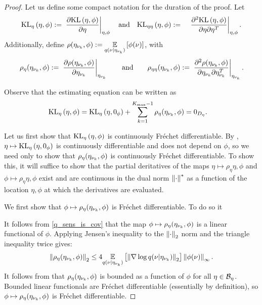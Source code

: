 \begin{thm}
\begin{proof}
Let us define some compact notation for the duration of the proof.
Let
%
\begin{align*}
%
\KLgrad{\eta, \phi} :={}&
    \fracat{\partial \KL{\eta, \phi}}{\partial \eta}{\eta, \phi}
\mathtxt{and}
\KLhess{\eta, \phi} :={}&
    \fracat{\partial^2 \KL{\eta, \phi}}
           {\partial \eta \partial \eta^T}{\eta, \phi}.
%
\end{align*}
%
Additionally, define $\rho(\eta_{\nu_{k}}, \phi) :={} \underset{q(\nu \vert
\eta_{\nu_{k}})}{\mathbb{E}}\left[\phi(\nu)\right]$, with
%
\begin{align*}
%
\rho_\eta(\etanuk, \phi) :={}
\fracat{\partial \rho(\etanuk, \phi)}
       {\partial \etanuk}{\etanuk} \mathand
\rho_{\eta\eta}(\etanuk, \phi) :={}
   \fracat{\partial^2 \rho(\etanuk, \phi)}
          {\partial \etanuk \partial \etanuk^T}{\etanuk}.
%
\end{align*}

Observe that the estimating equation can be written as
%
\begin{align*}
%
%
\KLgrad{\eta, \phi} ={}&
\KLgrad{\eta, \phiz} + \sumkm \rho_\eta(\etanuk, \phi)
= 0_\etadim.
%
\end{align*}

Let us first show that $\mathrm{KL}_{\eta}\left(\eta, \phi\right)$ is continuously Fr{\'e}chet
differentiable.  By , $\eta \mapsto \mathrm{KL}_{\eta}\left(\eta, 0_\phi\right)$
is continuously differentiable and does not depend on $\phi$, so we need only to
show that $\rho_\eta(\eta_{\nu_{k}}, \phi)$ is continuously Fr{\'e}chet differentiable.
To show this, it will suffice to show that the partial deritatives of the maps
$\eta \mapsto \rho_\eta{\eta, \phi}$ and $\phi \mapsto \rho_\eta{\eta, \phi}$
exist and are continuous in the dual norm $\left\Vert\cdot\right\Vert^*$ as a function of the
location $\eta, \phi$ at which the derivatives are evaluated.

We first show that $\phi \mapsto \rho_\eta(\eta_{\nu_{k}}, \phi)$ is Fr{\'e}chet
differentiable.  To do so it


It follows from \eqref{q_sens_is_cov} that the map $\phi \mapsto
\rho_\eta(\eta_{\nu_{k}}, \phi)$ is a linear functional of $\phi$.  Applying Jensen's
inequality to the $\left\Vert\cdot\right\Vert_2$ norm and the triangle inequality twice gives:
%
\begin{align*}
%
\norm{\rho_\eta(\etanuk, \phi)}_2 \le
    4 \expect{\q(\nu \vert \etanuk)}
             {\norm{\nabla \log \q(\nu \vert \etanuk)}_2}
              \norminf{\phi(\nu)}.
%
\end{align*}
%
It follows from  that $\rho_\eta(\eta_{\nu_{k}}, \phi)$ is bounded
as a function of $\phi$ for all $\eta \in \mathcal{B}_\eta$.  Bounded linear
functionals are Fr{\'e}chet differentiable (essentially by definition), so $\phi
\mapsto \rho_\eta(\eta_{\nu_{k}}, \phi)$ is Fr{\'e}chet differentiable.


\end{proof}
\end{thm}

